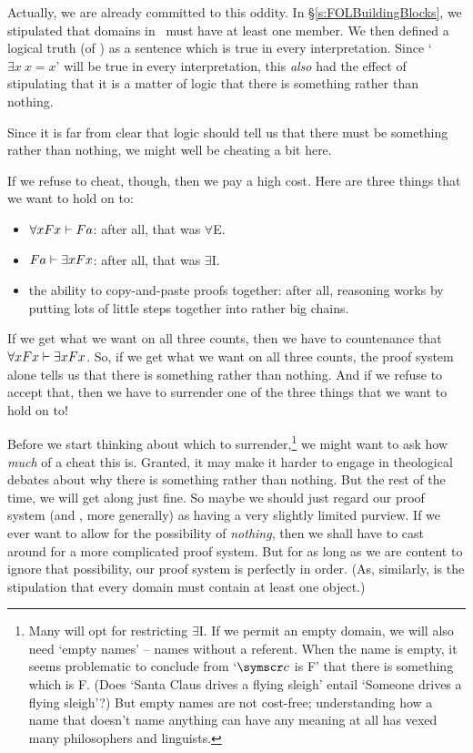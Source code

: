 Actually, we are already committed to this oddity. In §\ref{s:FOLBuildingBlocks}, we stipulated that domains in \FOL\ must have at least one member. We then defined a logical truth (of \FOL) as a sentence which is true in every interpretation. Since `$\exists x\ x=x$' will be true in every interpretation, this \emph{also} had the effect of stipulating that it is a matter of logic that there is something rather than nothing.

Since it is far from clear that logic should tell us that there must be something rather than nothing, we might well be cheating a bit here. 

If we refuse to cheat, though, then we pay a high cost. Here are three things that we want to hold on to:
	\begin{itemize}
		\item $\forall x Fx \vdash Fa$: after all, that was $\forall$E.
		\item $Fa \vdash \exists x Fx$: after all, that was $\exists$I.
		\item the ability to copy-and-paste proofs together: after all, reasoning works by putting lots of little steps together into rather big chains.
	\end{itemize}
If we get what we want on all three counts, then we have to countenance that $\forall xFx \vdash \exists x Fx$. So, if we get what we want on all three counts, the proof system alone tells us that there is something rather than nothing. And if we refuse to accept that, then we have to surrender one of the three things that we want to hold on to!

Before we start thinking about which to surrender,\footnote{Many will opt for restricting $\exists$I. If we permit an empty domain, we will also need `empty names' – names without a referent. When the name  is empty, it seems problematic to conclude from `$\meta{c}$ is F' that there is something which is F. (Does `Santa Claus drives a flying sleigh' entail `Someone drives a flying sleigh'?) But empty names are not cost-free; understanding how a name that doesn't name anything can have any meaning at all has vexed many philosophers and linguists.} we might want to ask how \emph{much} of a cheat this is. Granted, it may make it harder to engage in theological debates about why there is something rather than nothing. But the rest of the time, we will get along just fine. So maybe we should just regard our proof system (and \FOL, more generally) as having a very slightly limited purview. If we ever want to allow for the possibility of \emph{nothing}, then we shall have to cast around for a more complicated proof system. But for as long as we are content to ignore that possibility, our proof system is perfectly in order. (As, similarly, is the stipulation that every domain must contain at least one object.)


